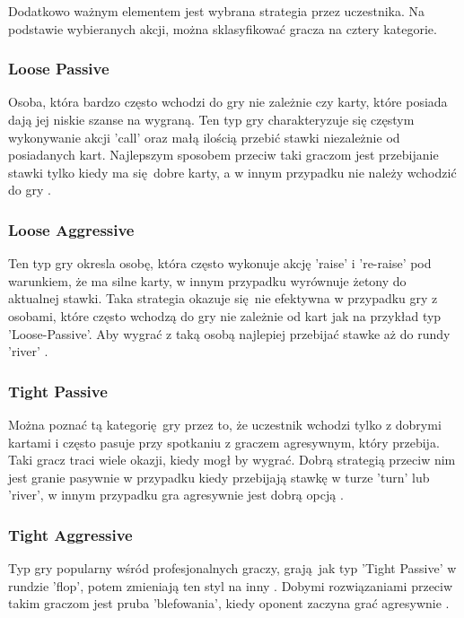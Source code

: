 \documentclass[12pt,oneside,a4paper]{report}
\begin{document}
Dodatkowo ważnym elementem jest wybrana strategia przez uczestnika. Na podstawie
wybieranych akcji, można sklasyfikować gracza na cztery kategorie. 

\subsubsection{Loose Passive}

Osoba, która bardzo często wchodzi do gry nie zależnie czy karty, które posiada dają jej
niskie szanse na wygraną. Ten typ gry charakteryzuje się częstym wykonywanie akcji 'call' oraz
małą ilością przebić stawki niezależnie od posiadanych kart. 
Najlepszym sposobem przeciw taki graczom jest przebijanie stawki tylko
kiedy ma się dobre karty, a w innym przypadku nie należy wchodzić do gry \cite{class}.

\subsubsection{Loose Aggressive}

Ten typ gry okresla osobę, która często wykonuje akcję 'raise' i 're-raise' 
pod warunkiem, że ma silne karty, w innym przypadku wyrównuje żetony do aktualnej stawki.
Taka strategia okazuje się nie efektywna w przypadku gry z osobami, które często wchodzą do gry nie 
zależnie od kart jak na przykład typ 'Loose-Passive'. Aby wygrać z taką osobą najlepiej 
przebijać stawke aż do rundy 'river' \cite{class}.

\subsubsection{Tight Passive}

Można poznać tą kategorię gry przez to, że uczestnik wchodzi tylko z dobrymi kartami i często 
pasuje przy spotkaniu z graczem agresywnym, który przebija. Taki gracz traci wiele okazji, kiedy
mogł by wygrać. Dobrą strategią przeciw nim jest granie pasywnie w przypadku kiedy przebijają stawkę
w turze 'turn' lub 'river', w innym przypadku gra agresywnie jest dobrą opcją \cite{class}.


\subsubsection{Tight Aggressive}

Typ gry popularny wśród profesjonalnych graczy, grają jak typ 'Tight Passive' w rundzie 'flop',
potem zmieniają ten styl na inny \cite{class}.
Dobymi rozwiązaniami przeciw takim graczom jest pruba 'blefowania', kiedy oponent zaczyna grać
agresywnie \cite{class}.
\end{document}
